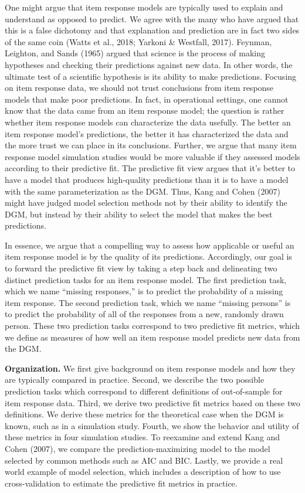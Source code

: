 \documentclass[
  english,
  man,floatsintext]{apa7}
\begin{document}
One might argue that item response models are typically used to explain and understand as opposed to predict. We agree with the many who have argued that this is a false dichotomy and that explanation and prediction are in fact two sides of the same coin (Watts et al., 2018; Yarkoni \& Westfall, 2017). Feynman, Leighton, and Sands (1965) argued that science is the process of making hypotheses and checking their predictions against new data. In other words, the ultimate test of a scientific hypothesis is its ability to make predictions. Focusing on item response data, we should not trust conclusions from item response models that make poor predictions. In fact, in operational settings, one cannot know that the data came from an item response model; the question is rather whether item response models can characterize the data usefully. The better an item response model's predictions, the better it has characterized the data and the more trust we can place in its conclusions. Further, we argue that many item response model simulation studies would be more valuable if they assessed models according to their predictive fit. The predictive fit view argues that it's better to have a model that produces high-quality predictions than it is to have a model with the same parameterization as the DGM. Thus, Kang and Cohen (2007) might have judged model selection methods not by their ability to identify the DGM, but instead by their ability to select the model that makes the best predictions.

In essence, we argue that a compelling way to assess how applicable or useful an item response model is by the quality of its predictions. Accordingly, our goal is to forward the predictive fit view by taking a step back and delineating two distinct prediction tasks for an item response model. The first prediction task, which we name ``missing responses,'' is to predict the probability of a missing item response. The second prediction task, which we name ``missing persons'' is to predict the probability of all of the responses from a new, randomly drawn person. These two prediction tasks correspond to two predictive fit metrics, which we define as measures of how well an item response model predicts new data from the DGM.

\textbf{Organization.} We first give background on item response models and how they are typically compared in practice. Second, we describe the two possible prediction tasks which correspond to different definitions of out-of-sample for item response data. Third, we derive two predictive fit metrics based on these two definitions. We derive these metrics for the theoretical case when the DGM is known, such as in a simulation study. Fourth, we show the behavior and utility of these metrics in four simulation studies. To reexamine and extend Kang and Cohen (2007), we compare the prediction-maximizing model to the model selected by common methods such as AIC and BIC. Lastly, we provide a real world example of model selection, which includes a description of how to use cross-validation to estimate the predictive fit metrics in practice.
\end{document}
